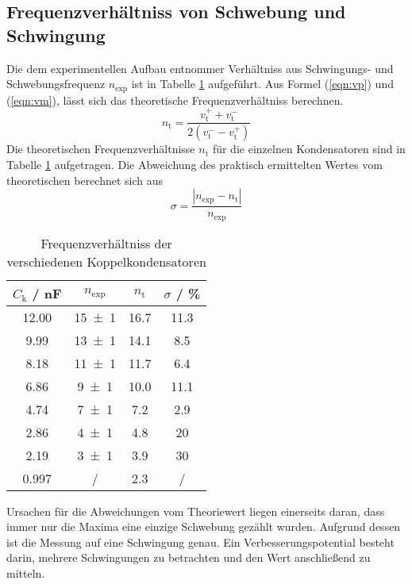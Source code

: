 \subsection{Frequenzverhältniss von Schwebung und Schwingung}

Die dem experimentellen Aufbau entnommer Verhältniss aus Schwingungs- und Schwebungsfrequenz $n_\text{exp}$ ist in Tabelle \ref{tab:n} aufgeführt. Aus Formel (\ref{eqn:vp}) und (\ref{eqn:vm}), lässt sich das theoretische Frequenzverhältniss berechnen.
\begin{equation}
  n_\text{t} = \frac{ v_\text{t}^+ + v_\text{t}^- }{2(v_\text{t}^- - v_\text{t}^+)}
  \label{eqn:n_t}
\end{equation}
Die theoretischen Frequenzverhältnisse $n_\text{t}$ für die einzelnen Kondensatoren sind in Tabelle \ref{tab:n} aufgetragen. Die Abweichung des praktisch ermittelten Wertes vom theoretischen berechnet sich aus
\begin{equation}
  \sigma = \frac{| n_\text{exp} - n_\text{t} |}{n_\text{exp}}
\end{equation}
\begin{table}
  \centering
  \begin{tabular}{c c c c}
    \toprule
    $C_\text{k}$ / nF & $n_\text{exp}$ & $n_\text{t}$ & $\sigma$ / \%	\\
    \midrule
    12.00	& \num{15 +- 1}	& 16.7	& 11.3	\\
    9.99	& \num{13 +- 1} & 14.1	& 8.5	\\
    8.18	& \num{11 +- 1}	& 11.7	& 6.4	\\
    6.86	& \num{9 +- 1}	& 10.0	& 11.1	\\
    4.74	& \num{7 +- 1}	& 7.2	& 2.9	\\
    2.86	& \num{4 +- 1}	& 4.8	& 20	\\
    2.19	& \num{3 +- 1} 	& 3.9	& 30	\\
    0.997	& /		& 2.3	& /	\\
    \bottomrule
  \end{tabular}
  \caption{Frequenzverhältniss der verschiedenen Koppelkondensatoren}
  \label{tab:n}
\end{table}
Ursachen für die Abweichungen vom Theoriewert liegen einerseits daran, dass immer nur die Maxima eine einzige Schwebung gezählt wurden. Aufgrund dessen ist die Messung auf eine Schwingung genau. Ein Verbesserungspotential besteht darin, mehrere Schwingungen zu betrachten und den Wert anschließend zu mitteln.
